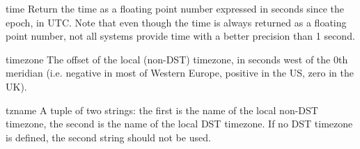 \begin{funcdesc}{time}{}
Return the time as a floating point number expressed in seconds since
the epoch, in UTC.  Note that even though the time is always returned
as a floating point number, not all systems provide time with a better
precision than 1 second.
\end{funcdesc}

\begin{datadesc}{timezone}
The offset of the local (non-DST) timezone, in seconds west of the 0th
meridian (i.e. negative in most of Western Europe, positive in the US,
zero in the UK).
\end{datadesc}

\begin{datadesc}{tzname}
A tuple of two strings: the first is the name of the local non-DST
timezone, the second is the name of the local DST timezone.  If no DST
timezone is defined, the second string should not be used.
\end{datadesc}

